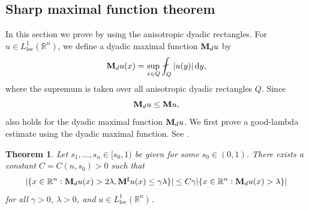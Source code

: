 \documentclass[11pt]{amsart}
\theoremstyle{plain}
\newtheorem{theorem}{Theorem}[section]
\theoremstyle{definition}
\numberwithin{equation}{section}
\begin{document}
\begin{appendix}
 

\section{Sharp maximal function theorem} \label{sec:sharp_maximal}
In this section we prove  by using the anisotropic dyadic rectangles. For $u \in L^1_{\mathrm{loc}}(\mathbb{R}^n)$, we define a dyadic maximal function ${\bf M}_du$ by
\begin{equation*}
{\bf M}_du(x) = \sup_{x \in Q} \fint_{Q} |u(y)| \,\mathrm{d}y,
\end{equation*}
where the supremum is taken over all anisotropic dyadic rectangles $Q$. Since
\begin{equation} \label{eq:MdM}
{\bf M}_d u \leq {\bf M}u,
\end{equation}
 also holds for the dyadic maximal function ${\bf M}_du$. We first prove a good-lambda estimate using the dyadic maximal function. See \cite[Theorem 3.4.4]{GrafakosMF}.

\begin{theorem} \label{thm:good_lambda}
Let $s_1, \dots, s_n \in [s_0, 1)$ be given for some $s_0 \in (0,1)$. There exists a constant $C = C(n, s_0) > 0$ such that 
\begin{equation*}
|\lbrace x \in \mathbb{R}^n: {\bf M}_d u(x) > 2\lambda, {\bf M}^{\sharp}u(x) \leq \gamma \lambda \rbrace| \leq C\gamma |\lbrace x \in \mathbb{R}^n: {\bf M}_d u(x) > \lambda \rbrace|
\end{equation*}
for all $\gamma>0$, $\lambda > 0$, and $u \in L^1_{\mathrm{loc}}(\mathbb{R}^n)$.
\end{theorem}


\end{appendix}
\end{document}
